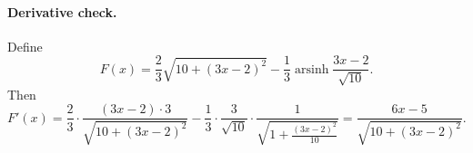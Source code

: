 \documentclass[12pt]{article}
\begin{document}
\paragraph{Derivative check.}
Define
\[
F(x)=\frac{2}{3}\sqrt{10+(3x-2)^{2}}-\frac{1}{3}\operatorname{arsinh}\!\frac{3x-2}{\sqrt{10}}.
\]
Then
\[
F'(x)=\frac{2}{3}\cdot\frac{(3x-2)\cdot 3}{\sqrt{10+(3x-2)^2}}
-\frac{1}{3}\cdot\frac{3}{\sqrt{10}}\cdot\frac{1}{\sqrt{1+\frac{(3x-2)^2}{10}}}
=\frac{6x-5}{\sqrt{10+(3x-2)^{2}}}.
\]
\end{document}
